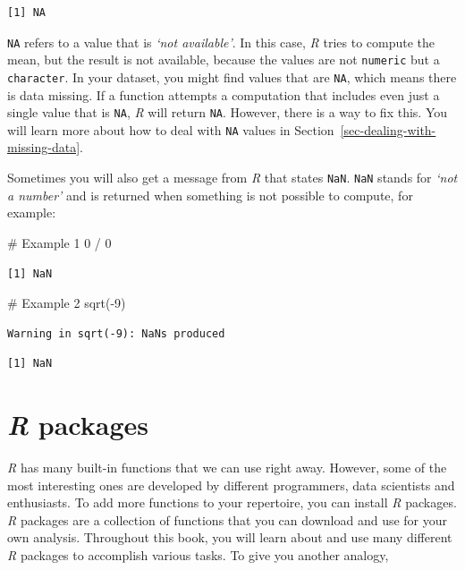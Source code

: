 \documentclass[
  letterpaper,
  DIV=11,
  numbers=noendperiod]{scrreprt}
\newenvironment{Shaded}{\begin{snugshade}}{\end{snugshade}}
\newcommand{\CommentTok}[1]{\textcolor[rgb]{0.37,0.37,0.37}{#1}}
\newcommand{\DecValTok}[1]{\textcolor[rgb]{0.68,0.00,0.00}{#1}}
\newcommand{\FunctionTok}[1]{\textcolor[rgb]{0.28,0.35,0.67}{#1}}
\newcommand{\NormalTok}[1]{\textcolor[rgb]{0.00,0.23,0.31}{#1}}
\newcommand{\SpecialCharTok}[1]{\textcolor[rgb]{0.37,0.37,0.37}{#1}}
\begin{document}
\begin{verbatim}
[1] NA
\end{verbatim}

\texttt{NA} refers to a value that is \emph{`not available'}. In this
case, \emph{R} tries to compute the mean, but the result is not
available, because the values are not \texttt{numeric} but a
\texttt{character}. In your dataset, you might find values that are
\texttt{NA}, which means there is data missing. If a function attempts a
computation that includes even just a single value that is \texttt{NA},
\emph{R} will return \texttt{NA}. However, there is a way to fix this.
You will learn more about how to deal with \texttt{NA} values in
Section~\ref{sec-dealing-with-missing-data}.

Sometimes you will also get a message from \emph{R} that states
\texttt{NaN}. \texttt{NaN} stands for \emph{`not a number'} and is
returned when something is not possible to compute, for example:

\begin{Shaded}
\begin{Highlighting}[]
\CommentTok{\# Example 1}
\DecValTok{0} \SpecialCharTok{/} \DecValTok{0}
\end{Highlighting}
\end{Shaded}

\begin{verbatim}
[1] NaN
\end{verbatim}

\begin{Shaded}
\begin{Highlighting}[]
\CommentTok{\# Example 2}
\FunctionTok{sqrt}\NormalTok{(}\SpecialCharTok{{-}}\DecValTok{9}\NormalTok{)}
\end{Highlighting}
\end{Shaded}

\begin{verbatim}
Warning in sqrt(-9): NaNs produced
\end{verbatim}

\begin{verbatim}
[1] NaN
\end{verbatim}

\section{\texorpdfstring{\emph{R}
packages}{R packages}}\label{sec-r-packages}

\emph{R} has many built-in functions that we can use right away.
However, some of the most interesting ones are developed by different
programmers, data scientists and enthusiasts. To add more functions to
your repertoire, you can install \emph{R} packages. \emph{R} packages
are a collection of functions that you can download and use for your own
analysis. Throughout this book, you will learn about and use many
different \emph{R} packages to accomplish various tasks. To give you
another analogy,
\end{document}

